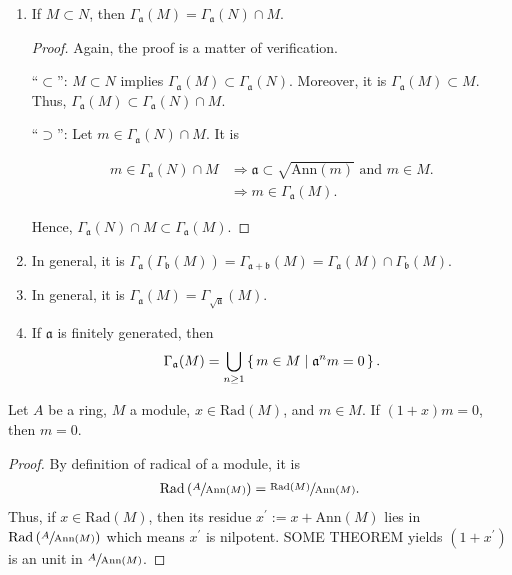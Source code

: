 \begin{example}
\begin{enumerate}
        \item If \(M \subset N\), then \(\Gamma_\mathfrak{a}(M) = \Gamma_\mathfrak{a}(N) \cap M\).
        
        \begin{proof}
            Again, the proof is a matter of verification.

            ``\(\subset\)'': \(M \subset N\) implies \(\Gamma_\mathfrak{a}(M) \subset \Gamma_\mathfrak{a}(N)\). Moreover, it is \(\Gamma_\mathfrak{a}(M) \subset M\). Thus, \(\Gamma_\mathfrak{a}(M) \subset \Gamma_\mathfrak{a}(N) \cap M\).

            ``\(\supset\)'': Let \(m \in \Gamma_\mathfrak{a}(N) \cap M\). It is
            
            \begin{align*}
                m \in \Gamma_\mathfrak{a}(N) \cap M & \Rightarrow \mathfrak{a} \subset \sqrt{\mathrm{Ann}(m)} \text{ and } m \in M \text{.} \\
                & \Rightarrow m \in \Gamma_\mathfrak{a}(M) \text{.}
            \end{align*}

            Hence, \(\Gamma_\mathfrak{a}(N) \cap M \subset \Gamma_\mathfrak{a}(M)\).
        \end{proof}
            \item In general, it is \(\Gamma_\mathfrak{a}(\Gamma_\mathfrak{b}(M)) = \Gamma_{\mathfrak{a} + \mathfrak{b}}(M) = \Gamma_\mathfrak{a}(M) \cap \Gamma_\mathfrak{b}(M)\).
            \item In general, it is \(\Gamma_\mathfrak{a}(M) = \Gamma_{\sqrt{\mathfrak{a}}}(M)\).
            \item If \(\mathfrak{a}\) is finitely generated, then
            \begin{align*}
                \Gamma_\mathfrak{a}(M) = \bigcup_{n \geq 1} \left\{\, m \in M \mid \mathfrak{a}^n m = 0 \,\right\} \text{.}
            \end{align*}
    \end{enumerate}
\end{example}

\begin{example}
    Let \(A\) be a ring, \(M\) a module, \(x \in \mathrm{Rad}(M)\), and \(m \in M\). If \((1 + x)m = 0\), then \(m = 0\).
\end{example}

\begin{proof}
    By definition of radical of a module, it is
    \begin{align*}
        \mathrm{Rad} \left(\sfrac{A}{\mathrm{Ann}(M)}\right) = \sfrac{\mathrm{Rad}(M)}{\mathrm{Ann}(M)} \text{.}
    \end{align*}
    Thus, if \(x \in \mathrm{Rad}(M)\), then its residue \(x^\prime := x + \mathrm{Ann}(M)\) lies in \(\mathrm{Rad}\left(\sfrac{A}{\mathrm{Ann}(M)}\right)\) which means \(x^\prime\) is nilpotent. SOME THEOREM yields \((1 + x^\prime)\) is an unit in \(\sfrac{A}{\mathrm{Ann}(M)}\).
\end{proof}
